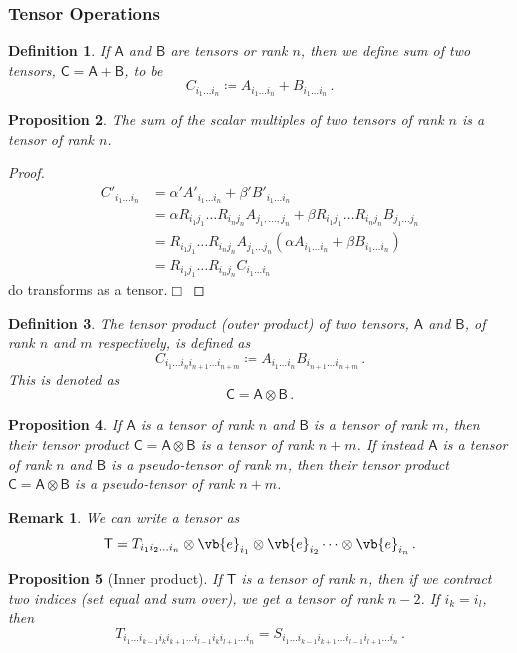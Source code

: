 \documentclass{article}
\theoremstyle{plain}\theoremheaderfont{\normalfont\itshape}\theorembodyfont{\rmfamily}\theoremseparator{.}\newtheorem*{rem}{Remark}\newtheorem*{ex}{Example}\newtheorem*{proof}{Proof}\newtheorem*{altp}{Alternative proof}
\theoremstyle{plain}\theoremheaderfont{\normalfont\bfseries}\theorembodyfont{\rmfamily}\theoremseparator{.}\newtheorem{thm}{Theorem}[section]\newtheorem{lem}[thm]{Lemma}\newtheorem{prop}[thm]{Proposition}\newtheorem*{cor}{Corollary}\newtheorem{defn}[thm]{Definition}\newtheorem{clm}[thm]{Claim}\newtheorem{clminproof}{Claim}
\theoremstyle{break}\theoremheaderfont{\normalfont\itshape}\theorembodyfont{\rmfamily}\theoremseparator{.\medskip}\newtheorem*{proofskip}{Proof}\newtheorem*{exs}{Examples}\newtheorem*{rems}{Remarks}
\theoremstyle{break}\theoremheaderfont{\normalfont\bfseries}\theorembodyfont{\rmfamily}\theoremseparator{.\medskip}\newtheorem{lemskip}[thm]{Lemma}\newtheorem{defnskip}[thm]{Definition}\newtheorem{propskip}[thm]{Proposition}\newtheorem{thmskip}[thm]{Theorem}
\numberwithin{equation}{section}
\newcommand{\qed}{\hfill\ensuremath{\Box}}
\begin{document}
	\subsubsection{Tensor Operations}
	\begin{defn}
		If \(\mathsf{A}\) and \(\mathsf{B}\) are tensors or rank \(n\), then we define sum of two tensors, \(\mathsf{C=A+B}\), to be
		\[C_{i_1\dots i_n}\coloneqq A_{i_1\dots i_n}+B_{i_1\dots i_n}\,.\]
	\end{defn}
	\begin{prop}
		The sum of the scalar multiples of two tensors of rank \(n\) is a tensor of rank \(n\).
	\end{prop}
	\begin{proof}
		\begin{align*}
			C'_{i_1\dots i_n}&=\alpha'A'_{i_1\dots i_n}+\beta' B'_{i_1\dots i_n}\\
			&=\alpha R_{i_1j_1}\dots R_{i_nj_n}A_{j_1,\dots,j_n}+\beta R_{i_1j_1}\dots R_{i_nj_n}B_{j_1\dots j_n}\\
			&=R_{i_1j_1}\dots R_{i_nj_n}A_{j_1\dots j_n}(\alpha A_{i_1\dots i_n}+\beta B_{i_1\dots i_n})\\
			&=R_{i_1j_1}\dots R_{i_nj_n}C_{i_1\dots i_n}
		\end{align*}
		do transforms as a tensor.\qed
	\end{proof}
	\begin{defn}
		The \textit{tensor product} (\textit{outer product}) of two tensors, \(\mathsf{A}\) and \(\mathsf{B}\), of rank \(n\) and \(m\) respectively, is defined as
		\[C_{i_1\dots i_ni_{n+1}\dots i_{n+m}}\coloneqq A_{i_1\dots i_n}B_{i_{n+1}\dots i_{n+m}}\,.\]
		This is denoted as
		\[\mathsf{C}=\mathsf{A}\otimes\mathsf{B}\,.\]
	\end{defn}
	\begin{prop}
		If \(\mathsf{A}\) is a tensor of rank \(n\) and \(\mathsf{B}\) is a tensor of rank \(m\), then their tensor product \(\mathsf{C=A\otimes B}\) is a tensor of rank \(n+m\). If instead \(\mathsf{A}\) is a tensor of rank \(n\) and \(\mathsf{B}\) is a pseudo-tensor of rank \(m\), then their tensor product \(\mathsf{C=A\otimes B}\) is a pseudo-tensor of rank \(n+m\).
	\end{prop}
	\begin{rem}
		We can write a tensor as
		\[\mathsf{T}=T_{i_1i_2\dots i_n}\otimes\vb{e}_{i_1}\otimes\vb{e}_{i_2}\dots\otimes\vb{e}_{i_n}\,.\]
	\end{rem}
	\begin{prop}[Inner product]
		If \(\mathsf{T}\) is a tensor of rank \(n\), then if we contract two indices (set equal and sum over), we get a tensor of rank \(n-2\). If \(i_k=i_l\), then
		\[T_{i_1\dots i_{k-1}i_ki_{k+1}\dots i_{l-1}i_ki_{l+1}\dots i_n}=S_{i_1\dots i_{k-1}i_{k+1}\dots i_{l-1}i_{l+1}\dots i_{n}}\,.\]
	\end{prop}
\end{document}
